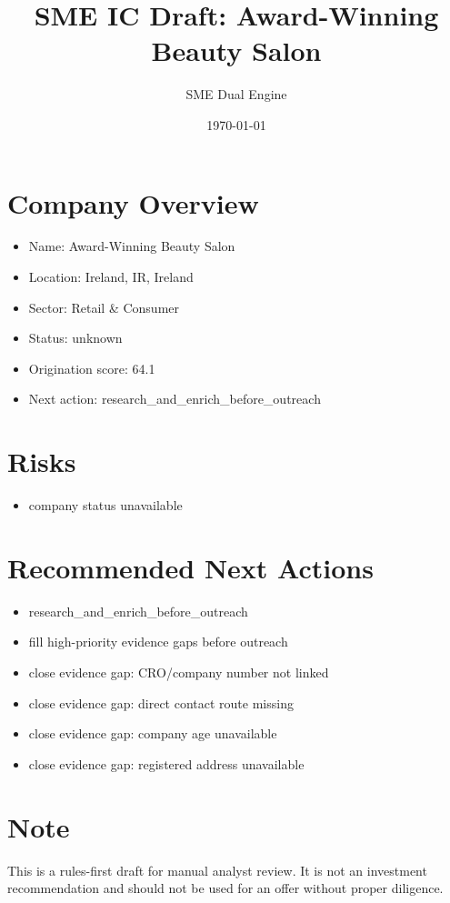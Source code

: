 \documentclass[11pt,a4paper]{article}
\title{SME IC Draft: Award-Winning Beauty Salon}
\author{SME Dual Engine}
\date{\today}
\begin{document}
\maketitle
\section*{Company Overview}
\begin{itemize}[leftmargin=1.4em]
\item Name: Award-Winning Beauty Salon
\item Location: Ireland, IR, Ireland
\item Sector: Retail \& Consumer
\item Status: unknown
\item Origination score: 64.1
\item Next action: research\_and\_enrich\_before\_outreach
\end{itemize}
\section*{Risks}
\begin{itemize}[leftmargin=1.4em]
\item company status unavailable
\end{itemize}
\section*{Recommended Next Actions}
\begin{itemize}[leftmargin=1.4em]
\item research\_and\_enrich\_before\_outreach
\item fill high-priority evidence gaps before outreach
\item close evidence gap: CRO/company number not linked
\item close evidence gap: direct contact route missing
\item close evidence gap: company age unavailable
\item close evidence gap: registered address unavailable
\end{itemize}
\section*{Note}
This is a rules-first draft for manual analyst review. It is not an investment
recommendation and should not be used for an offer without proper diligence.
\end{document}

